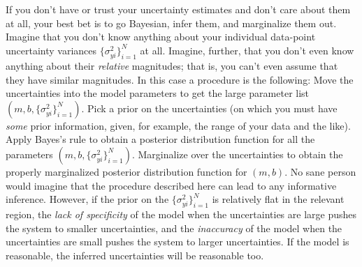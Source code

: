 \documentclass[12pt,twoside]{article}
\newcommand{\setofall}[3]{\{{#1}\}_{{#2}}^{{#3}}}
\newcommand{\allsigmay}{\setofall{\sigma_{yi}^2}{i=1}{N}}
\begin{document}
If you don't have or trust your uncertainty estimates and don't care
about them at all, your best bet is to go Bayesian, infer them, and
marginalize them out.  Imagine that you don't know anything about your
individual data-point uncertainty variances $\allsigmay$ at all.
Imagine, further, that you don't even know anything about their
\emph{relative} magnitudes; that is, you can't even assume that they
have similar magnitudes.  In this case a procedure is the following:
Move the uncertainties into the model parameters to get the large
parameter list $(m,b,\allsigmay)$.  Pick a prior on the uncertainties
(on which you must have \emph{some} prior information, given, for
example, the range of your data and the like).  Apply Bayes's rule to
obtain a posterior distribution function for all the parameters
$(m,b,\allsigmay)$.  Marginalize over the uncertainties to obtain the
properly marginalized posterior distribution function for $(m,b)$.  No
sane person would imagine that the procedure described here can lead
to any informative inference.  However, if the prior on the
$\allsigmay$ is relatively flat in the relevant region, the \emph{lack
  of specificity} of the model when the uncertainties are large pushes
the system to smaller uncertainties, and the \emph{inaccuracy} of the
model when the uncertainties are small pushes the system to larger
uncertainties.  If the model is reasonable, the inferred uncertainties
will be reasonable too.
\end{document}
